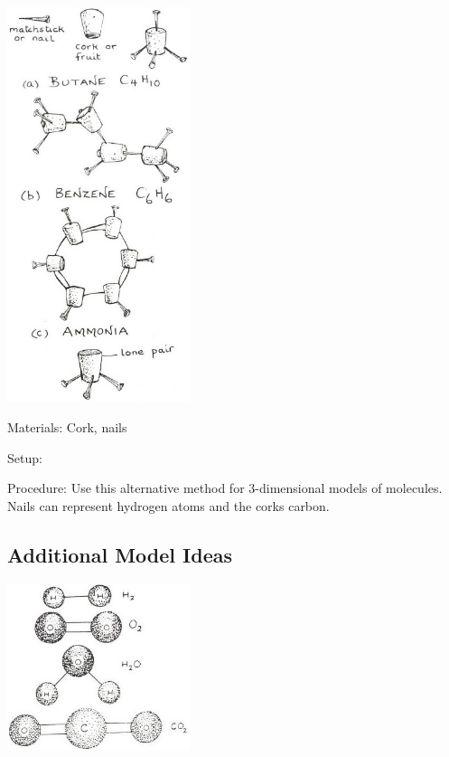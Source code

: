 \begin{multicols}{2}
\begin{center} %
\includegraphics[width=0.4\textwidth]{./img/source/3d-models-2.jpg}
\end{center}

\begin{description*}
\item[Materials:]{Cork, nails}
\item[Setup:]{}
\item[Procedure:]{Use this alternative method for 3-dimensional models of molecules. Nails can represent hydrogen atoms and the corks carbon.}
\end{description*}

\vfill
\columnbreak

\subsection{Additional Model Ideas}

\begin{center}
\includegraphics[width=0.4\textwidth]{./img/source/3d-models.jpg}
\end{center}


\end{multicols}

